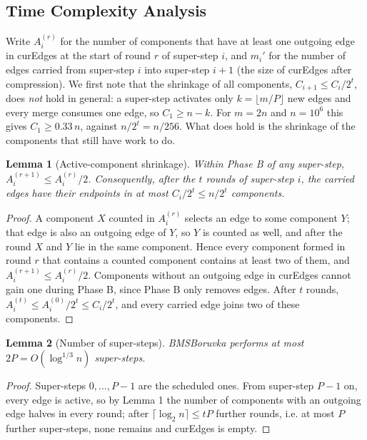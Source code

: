 \documentclass[11pt]{article}
\theoremstyle{plain}
\newtheorem{lemma}{Lemma}
\theoremstyle{remark}
\begin{document}
\subsection{Time Complexity Analysis}

Write \(A_i^{(r)}\) for the number of components that have at least one
outgoing edge in curEdges at the start of round \(r\) of super-step
\(i\), and \(m_i'\) for the number of edges carried from super-step
\(i\) into super-step \(i+1\) (the size of curEdges after compression).
We first note that the shrinkage of all components,
\(C_{i+1} \le C_i/2^{t}\), does \emph{not} hold in general: a super-step
activates only \(k = \lfloor m/P \rfloor\) new edges and every merge
consumes one edge, so \(C_1 \ge n - k\). For \(m = 2n\) and
\(n = 10^6\) this gives \(C_1 \ge 0.33\,n\), against \(n/2^{t} = n/256\).
What does hold is the shrinkage of the components that still have work
to do.

\begin{lemma}[Active-component shrinkage]
Within Phase B of any super-step, \(A_i^{(r+1)} \le A_i^{(r)}/2\).
Consequently, after the \(t\) rounds of super-step \(i\), the carried
edges have their endpoints in at most \(C_i/2^{t} \le n/2^{t}\)
components.
\end{lemma}

\begin{proof}
A component \(X\) counted in \(A_i^{(r)}\) selects an edge to some
component \(Y\); that edge is also an outgoing edge of \(Y\), so \(Y\)
is counted as well, and after the round \(X\) and \(Y\) lie in the same
component. Hence every component formed in round \(r\) that contains a
counted component contains at least two of them, and
\(A_i^{(r+1)} \le A_i^{(r)}/2\). Components without an outgoing edge in
curEdges cannot gain one during Phase B, since Phase B only removes
edges. After \(t\) rounds, \(A_i^{(t)} \le A_i^{(0)}/2^{t} \le
C_i/2^{t}\), and every carried edge joins two of these components.
\end{proof}

\begin{lemma}[Number of super-steps]
BMSBoruvka performs at most \(2P = O(\log^{1/3} n)\) super-steps.
\end{lemma}

\begin{proof}
Super-steps \(0,\dots,P-1\) are the scheduled ones. From super-step
\(P-1\) on, every edge is active, so by Lemma 1 the number of components
with an outgoing edge halves in every round; after
\(\lceil \log_2 n \rceil \le tP\) further rounds, i.e. at most \(P\)
further super-steps, none remains and curEdges is empty.
\end{proof}
\end{document}
